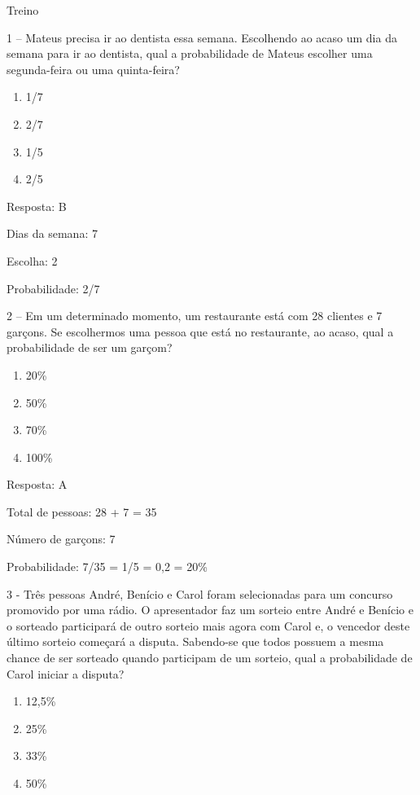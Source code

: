Treino

1 -- Mateus precisa ir ao dentista essa semana. Escolhendo ao acaso um
dia da semana para ir ao dentista, qual a probabilidade de Mateus
escolher uma segunda-feira ou uma quinta-feira?

\begin{enumerate}
\def\labelenumi{\alph{enumi})}
\item
  1/7
\item
  2/7
\item
  1/5
\item
  2/5
\end{enumerate}

Resposta: B

Dias da semana: 7

Escolha: 2

Probabilidade: 2/7

2 -- Em um determinado momento, um restaurante está com 28 clientes e 7
garçons. Se escolhermos uma pessoa que está no restaurante, ao acaso,
qual a probabilidade de ser um garçom?

\begin{enumerate}
\def\labelenumi{\alph{enumi})}
\item
  20\%
\item
  50\%
\item
  70\%
\item
  100\%
\end{enumerate}

Resposta: A

Total de pessoas: 28 + 7 = 35

Número de garçons: 7

Probabilidade: 7/35 = 1/5 = 0,2 = 20\%

3 - Três pessoas André, Benício e Carol foram selecionadas para um
concurso promovido por uma rádio. O apresentador faz um sorteio entre
André e Benício e o sorteado participará de outro sorteio mais agora com
Carol e, o vencedor deste último sorteio começará a disputa. Sabendo-se
que todos possuem a mesma chance de ser sorteado quando participam de um
sorteio, qual a probabilidade de Carol iniciar a disputa?

\begin{enumerate}
\def\labelenumi{\alph{enumi})}
\item
  12,5\%
\item
  25\%
\item
  33\%
\item
  50\%
\end{enumerate}

